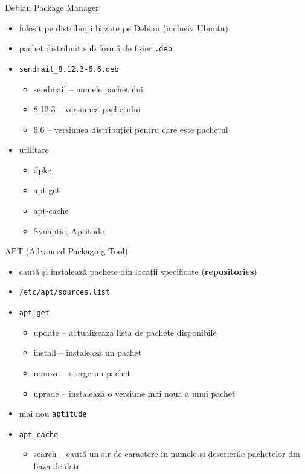 \documentclass{curs}
\begin{document}
\begin{frame}{Debian Package Manager}
  \begin{itemize}
    \item folosit pe distribuții bazate pe Debian (inclusiv Ubuntu)
    \item pachet distribuit sub formă de fișier \texttt{.deb}
    \item \texttt{sendmail\_8.12.3-6.6.deb}
    \begin{itemize}
      \item sendmail -- numele pachetului
      \item 8.12.3 -- versiunea pachetului
      \item 6.6 -- versiunea distribuției pentru care este pachetul
    \end{itemize}
    \item utilitare
    \begin{itemize}
      \item dpkg
      \item apt-get
      \item apt-cache
      \item Synaptic, Aptitude
    \end{itemize}
  \end{itemize}
\end{frame}

\begin{frame}{APT (Advanced Packaging Tool)}
  \begin{itemize}
    \item caută și instalează pachete din locații specificate
    (\textbf{repositories})
    \item \texttt{/etc/apt/sources.list}
    \item \texttt{apt-get}
    \begin{itemize}
      \item update -- actualizează lista de pachete disponibile
      \item install -- instalează un pachet
      \item remove -- șterge un pachet
      \item uprade -- instalează o versiune mai nouă a unui pachet
    \end{itemize}
    \item mai nou \texttt{aptitude}
    \item \texttt{apt-cache}
    \begin{itemize}
      \item search -- caută un șir de caractere în numele și descrierile
      pachetelor din baza de date
    \end{itemize}
  \end{itemize}
\end{frame}
\end{document}
